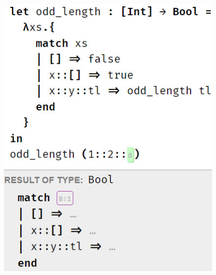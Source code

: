 \begin{figure}
{{			\includegraphics[scale=0.47,valign=t]{imgs/pat_match_exp_holes.png}
}}
\end{figure}
